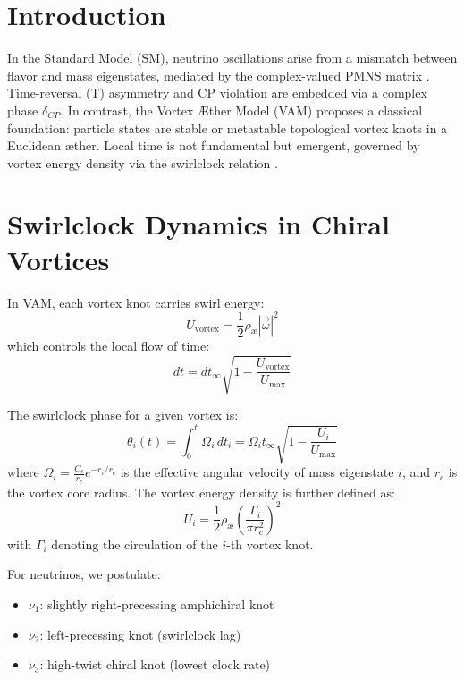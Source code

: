 



\section{Introduction}

In the Standard Model (SM), neutrino oscillations arise from a mismatch between flavor and mass eigenstates, mediated by the complex-valued PMNS matrix \cite{pontecorvo1957inverse, mns1962neutrino}. Time-reversal (T) asymmetry and CP violation are embedded via a complex phase \( \delta_{CP} \). In contrast, the Vortex \AE ther Model (VAM) proposes a classical foundation: particle states are stable or metastable topological vortex knots in a Euclidean \ae ther. Local time is not fundamental but emergent, governed by vortex energy density via the swirlclock relation \cite{VAM2025}.

\section{Swirlclock Dynamics in Chiral Vortices}

In VAM, each vortex knot carries swirl energy:
\begin{equation}
U_\text{vortex} = \frac{1}{2} \rho_\text{\ae} |\vec{\omega}|^2
\end{equation}
which controls the local flow of time:
\begin{equation}
dt = dt_\infty \sqrt{1 - \frac{U_\text{vortex}}{U_\text{max}}}
\end{equation}

The swirlclock phase for a given vortex is:
\begin{equation}
\theta_i(t) = \int_0^t \Omega_i \, dt_i = \Omega_i t_\infty \sqrt{1 - \frac{U_i}{U_\text{max}}}
\end{equation}
where \( \Omega_i = \frac{C_e}{r_c} e^{-r_i/r_c} \) is the effective angular velocity of mass eigenstate \( i \), and \( r_c \) is the vortex core radius. The vortex energy density is further defined as:
\begin{equation}
U_i = \frac{1}{2} \rho_\text{\ae} \left( \frac{\Gamma_i}{\pi r_c^2} \right)^2
\end{equation}
with \( \Gamma_i \) denoting the circulation of the \( i \)-th vortex knot.

For neutrinos, we postulate:
\begin{itemize}
\item \( \nu_1 \): slightly right-precessing amphichiral knot
\item \( \nu_2 \): left-precessing knot (swirlclock lag)
\item \( \nu_3 \): high-twist chiral knot (lowest clock rate)
\end{itemize}

